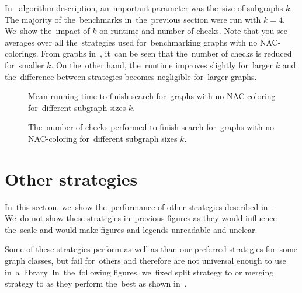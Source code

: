 In~\Subgraphs{} algorithm description, an~important parameter was the~size of subgraphs \( k \).
The majority of the~benchmarks in~the~previous section were run with \( k = 4 \).
%
We~show the~impact of	\( k \) on runtime and number of checks.
Note that you see averages over all the~strategies used for~benchmarking
graphs with no NAC-colorings.
%
From graphs in~,
it~can be seen that the~number of checks is reduced for~smaller \( k \).
On the~other hand, the~runtime improves slightly for~larger \( k \)
and the~difference between strategies becomes negligible for~larger graphs.

\begin{figure}[thbp]
	\centering
	\scalebox{\BenchFigureScale}{}
	\caption[Mean runtime for~graphs with no NAC-coloring]{
		Mean running time to finish search for~graphs with no NAC-coloring for~different subgraph sizes \( k \).}%
	\label{fig:graph_no_nac_coloring_first_runtime_subgraph_size}
\end{figure}%
\begin{figure}[thbp]
	\centering
	\scalebox{\BenchFigureScale}{}
	\caption[Checks performed for~graphs with no NAC-coloring]{
		The~number of checks performed to finish search for~graphs with no NAC-coloring for~different subgraph sizes \( k \).}%
	\label{fig:graph_no_nac_coloring_first_checks_subgraph_size}
\end{figure}%


\section{Other strategies}%
\label{sec:other_strategies}

In~this section, we~show the~performance of other strategies described in~.
We~do not show these strategies in~previous figures as they would influence
the~scale and would make figures and legends unreadable and unclear.

Some of these strategies perform as well as
than our preferred strategies for~some graph classes,
but fail for~others and therefore are not universal enough to use in~a~library.
%
In~the~following figures, we~fixed
split strategy to \Neighbors{} or merging strategy to \MergeLinear{}
as they perform the~best as shown in~.

